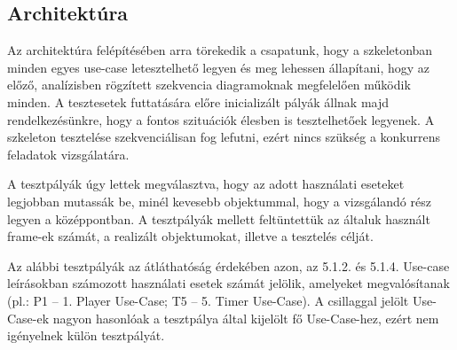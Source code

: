 	\subsection{Architektúra}
		Az architektúra felépítésében arra törekedik a csapatunk, hogy a szkeletonban minden egyes use-case letesztelhető legyen és meg lehessen állapítani, hogy az előző, analízisben rögzített szekvencia diagramoknak megfelelően működik minden. A tesztesetek futtatására előre inicializált pályák állnak majd rendelkezésünkre, hogy a fontos szituációk élesben is tesztelhetőek legyenek. A szkeleton tesztelése szekvenciálisan fog lefutni, ezért nincs szükség a konkurrens feladatok vizsgálatára.
		
		A tesztpályák úgy lettek megválasztva, hogy az adott használati eseteket legjobban mutassák be, minél kevesebb objektummal, hogy a vizsgálandó rész legyen a középpontban. A tesztpályák mellett feltüntettük az általuk használt frame-ek számát, a realizált objektumokat, illetve a tesztelés célját.
		
		Az alábbi tesztpályák az átláthatóság érdekében azon, az 5.1.2. és 5.1.4. Use-case leírásokban számozott használati esetek számát jelölik, amelyeket megvalósítanak (pl.: P1 -- 1. Player Use-Case; T5 -- 5. Timer Use-Case). A csillaggal jelölt Use-Case-ek nagyon hasonlóak a tesztpálya által kijelölt fő Use-Case-hez, ezért nem igényelnek külön tesztpályát.
								
